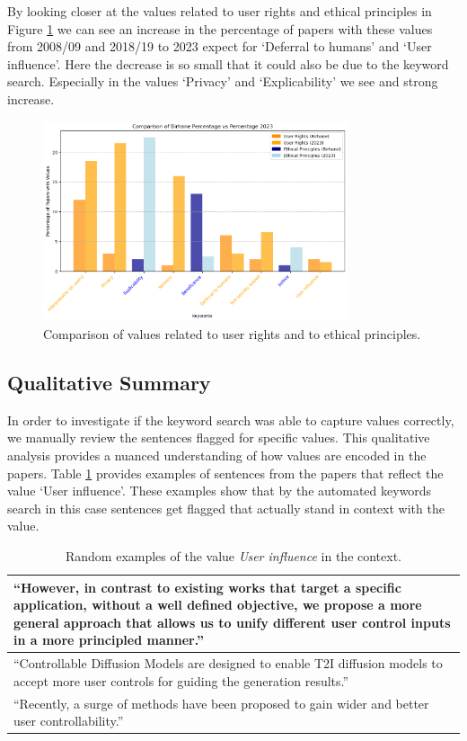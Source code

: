 \documentclass{article}
\begin{document}
By looking closer at the values related to user rights and ethical principles in Figure \ref{fig:subset_comparison_years}
we can see an increase in the percentage of papers with these values from 2008/09 and 2018/19 to 2023 expect for `Deferral to humans' and `User influence'. Here the 
decrease is so small that it could also be due to the keyword search. Especially in the values `Privacy' and `Explicability' we see and strong increase. 
\begin{figure}[H]
    \centering
    \includegraphics[width=0.8\textwidth,height=0.32\textheight]{../plots/subset_percentage_comparison.png}
    \caption{Comparison of values related to user rights and to ethical principles.}
    \label{fig:subset_comparison_years}
\end{figure}

\subsection{Qualitative Summary}
In order to investigate if the keyword search was able to capture values correctly, we manually review 
the sentences flagged for specific values. This qualitative analysis provides a nuanced understanding of how values are encoded in the papers. 
Table \ref{tab:qualitative_examples_user_influence} provides examples of sentences from the papers that reflect the value `User influence'. These
examples show that by the automated keywords search in this case sentences get flagged that actually stand in context with the value. 
\begin{table}[H]
    \centering
    \begin{tabular}{p{12cm}}
        \toprule
        ``However, in contrast to existing works that target a specific application, without a well defined objective, we propose a more general approach that allows us to unify different user control inputs in a more principled manner.'' \\
        \midrule
        ``Controllable Diffusion Models are designed to enable T2I diffusion models to accept more user controls for guiding the generation results.'' \\
        \midrule
        ``Recently, a surge of methods have been proposed to gain wider and better user controllability.'' \\
        \bottomrule
    \end{tabular}
    \caption{Random examples of the value \textit{User influence} in the context.}
    \label{tab:qualitative_examples_user_influence}
\end{table}
\end{document}
